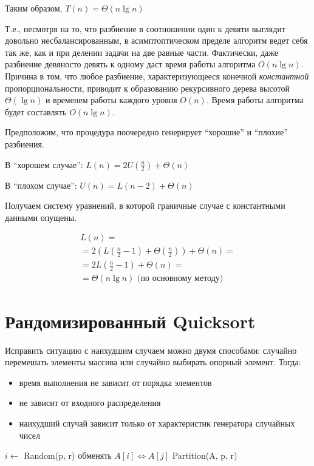 \documentclass[11pt]{article}
\begin{document}
Таким образом, $T(n) = \Theta(n \lg n)$

Т.е., несмотря на то, что разбиение в соотношении один к девяти выглядит довольно несбалансированным, в асимптоптическом пределе алгоритм ведет себя так же, как и при делении задачи на две равные части. Фактически, даже разбиение девяносто девять к одному даст время работы алгоритма $O(n \lg n)$. Причина в том, что любое разбиение, характеризующееся конечной \emph{константной} пропорциональности, приводит к образованию рекурсивного дерева высотой $\Theta(\lg n)$ и временем работы каждого уровня $O(n)$. Время работы алгоритма будет составлять $O(n \lg n)$.

Предположим, что процедура поочередно генерирует ``хорошие'' и ``плохие'' разбиения.

В ``хорошем случае'': $L(n) = 2U(\frac{n}{2}) + \Theta(n)$

В ``плохом случае'': $U(n) = L(n-2) + \Theta(n)$

Получаем систему уравнений, в которой граничные случае с константными данными опущены.

\begin{align*}
L(n) = \\
	= 2(L(\frac{n}{2} -1) + \Theta(\frac{n}{2})) + \Theta(n) = \\
	= 2L(\frac{n}{2} -1) + \Theta(n) = \\
	= \Theta(n \lg n) \text{ (по основному методу)}
\end{align*}

\section{Рандомизированный Quicksort}

Исправить ситуацию с наихудшим случаем можно двумя способами: случайно перемешать элементы массива или случайно выбирать опорный элемент. Тогда:
\begin{itemize}
\item время выполнения не зависит от порядка элементов
\item не зависит от входного распределения
\item наихудший случай зависит только от характеристик генератора случайных чисел
\end{itemize}

\begin{codebox}
\li	$i \gets $ Random(p, r)
\li	обменять $A[i] \iff A[j]$
\li	\Return Partition(A, p, r)
\End
\end{codebox}
\end{document}
